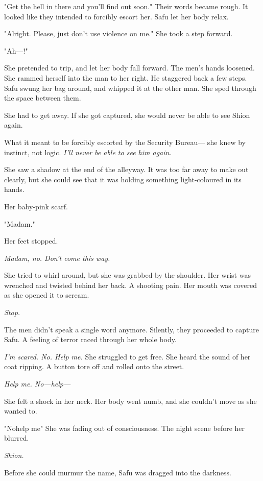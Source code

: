 "Get the hell in there and you'll find out soon." Their words became
rough. It looked like they intended to forcibly escort her. Safu let her
body relax.

"Alright. Please, just don't use violence on me." She took a step
forward.

"Ah---!"

She pretended to trip, and let her body fall forward. The men's hands
loosened. She rammed herself into the man to her right. He staggered
back a few steps. Safu swung her bag around, and whipped it at the other
man. She sped through the space between them.

She had to get away. If she got captured, she would never be able to see
Shion again.

What it meant to be forcibly escorted by the Security Bureau--- she knew
by instinct, not logic. \emph{I'll never be able to see him again.}

She saw a shadow at the end of the alleyway. It was too far away to make
out clearly, but she could see that it was holding something
light-coloured in its hands.

Her baby-pink scarf.

"Madam."

Her feet stopped.

\emph{Madam, no. Don't come this way.}

She tried to whirl around, but she was grabbed by the shoulder. Her
wrist was wrenched and twisted behind her back. A shooting pain. Her
mouth was covered as she opened it to scream.

\emph{Stop.}

The men didn't speak a single word anymore. Silently, they proceeded to
capture Safu. A feeling of terror raced through her whole body.

\emph{I'm scared. No. Help me.} She struggled to get free. She heard the sound
of her coat ripping. A button tore off and rolled onto the street.

\emph{Help me. No---help---}

She felt a shock in her neck. Her body went numb, and she couldn't move
as she wanted to.

"No\el help me\el " She was fading out of consciousness. The night scene
before her blurred.

\emph{Shion.}

Before she could murmur the name, Safu was dragged into the darkness.

\myspace


